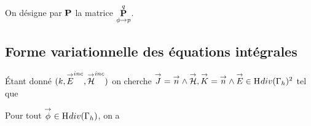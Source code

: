 


    \begin{defn}
      On désigne par \(\mPP\) la matrice \(\mP{\phi}{p}{q}\).
    \end{defn}






  \subsection{Forme variationnelle des équations intégrales}
    Étant donné \((k,\vE^{inc},\vH^{inc})\) on cherche \(\vJ = \vn \pvect \vH, \vK = \vn \pvect \vE \in \Hdiv(\Gamma_h)^2\)  tel que

    Pour tout \(\vect{\phi} \in \Hdiv(\Gamma_h)\), on a

